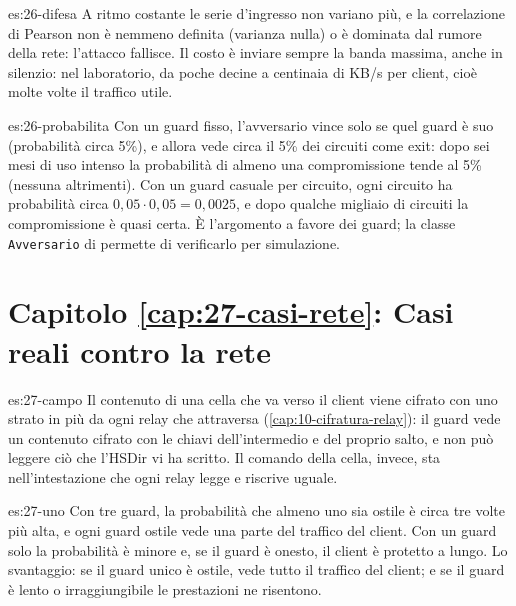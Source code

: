 \begin{soluzione}{es:26-difesa}
A ritmo costante le serie d'ingresso non variano più, e la correlazione di Pearson non è nemmeno definita (varianza nulla) o è dominata dal rumore della rete: l'attacco fallisce. Il costo è inviare sempre la banda massima, anche in silenzio: nel laboratorio, da poche decine a centinaia di KB/s per client, cioè molte volte il traffico utile.
\end{soluzione}

\begin{soluzione}{es:26-probabilita}
Con un guard fisso, l'avversario vince solo se quel guard è suo (probabilità circa 5\%), e allora vede circa il 5\% dei circuiti come exit: dopo sei mesi di uso intenso la probabilità di almeno una compromissione tende al 5\% (nessuna altrimenti). Con un guard casuale per circuito, ogni circuito ha probabilità circa $0{,}05 \cdot 0{,}05 = 0{,}0025$, e dopo qualche migliaio di circuiti la compromissione è quasi certa. È l'argomento a favore dei guard; la classe \texttt{Avversario} di  permette di verificarlo per simulazione.
\end{soluzione}

\section*{Capitolo \ref{cap:27-casi-rete}: Casi reali contro la rete}

\begin{soluzione}{es:27-campo}
Il contenuto di una cella che va verso il client viene cifrato con uno strato in più da ogni relay che attraversa (\cref{cap:10-cifratura-relay}): il guard vede un contenuto cifrato con le chiavi dell'intermedio e del proprio salto, e non può leggere ciò che l'HSDir vi ha scritto. Il comando della cella, invece, sta nell'intestazione che ogni relay legge e riscrive uguale.
\end{soluzione}

\begin{soluzione}{es:27-uno}
Con tre guard, la probabilità che almeno uno sia ostile è circa tre volte più alta, e ogni guard ostile vede una parte del traffico del client. Con un guard solo la probabilità è minore e, se il guard è onesto, il client è protetto a lungo. Lo svantaggio: se il guard unico è ostile, vede tutto il traffico del client; e se il guard è lento o irraggiungibile le prestazioni ne risentono.
\end{soluzione}

